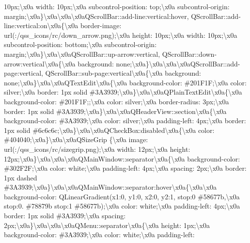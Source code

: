 \begin{DoxyCompactItemize}
10px;\textbackslash{}x0a width\+: 10px;\textbackslash{}x0a subcontrol-\/position\+: top;\textbackslash{}x0a subcontrol-\/origin\+: margin;\textbackslash{}x0a\}\textbackslash{}x0a\textbackslash{}x0a\textbackslash{}x0a\+Q\+Scroll\+Bar\+::add-\/line\+:vertical\+:hover, Q\+Scroll\+Bar\+::add-\/line\+:vertical\+:on\textbackslash{}x0a\{\textbackslash{}x0a border-\/image\+: url(\+:/qss\+\_\+icons/rc/down\+\_\+arrow.\+png);\textbackslash{}x0a height\+: 10px;\textbackslash{}x0a width\+: 10px;\textbackslash{}x0a subcontrol-\/position\+: bottom;\textbackslash{}x0a subcontrol-\/origin\+: margin;\textbackslash{}x0a\}\textbackslash{}x0a\textbackslash{}x0a\+Q\+Scroll\+Bar\+::up-\/arrow\+:vertical, Q\+Scroll\+Bar\+::down-\/arrow\+:vertical\textbackslash{}x0a\{\textbackslash{}x0a background\+: none;\textbackslash{}x0a\}\textbackslash{}x0a\textbackslash{}x0a\textbackslash{}x0a\+Q\+Scroll\+Bar\+::add-\/page\+:vertical, Q\+Scroll\+Bar\+::sub-\/page\+:vertical\textbackslash{}x0a\{\textbackslash{}x0a background\+: none;\textbackslash{}x0a\}\textbackslash{}x0a\textbackslash{}x0a\+Q\+Text\+Edit\textbackslash{}x0a\{\textbackslash{}x0a background-\/color\+: \#201\+F1\+F;\textbackslash{}x0a color\+: silver;\textbackslash{}x0a border\+: 1px solid \#3\+A3939;\textbackslash{}x0a\}\textbackslash{}x0a\textbackslash{}x0a\+Q\+Plain\+Text\+Edit\textbackslash{}x0a\{\textbackslash{}x0a background-\/color\+: \#201\+F1\+F;;\textbackslash{}x0a color\+: silver;\textbackslash{}x0a border-\/radius\+: 3px;\textbackslash{}x0a border\+: 1px solid \#3\+A3939;\textbackslash{}x0a\}\textbackslash{}x0a\textbackslash{}x0a\+Q\+Header\+View\+::section\textbackslash{}x0a\{\textbackslash{}x0a background-\/color\+: \#3\+A3939;\textbackslash{}x0a color\+: silver;\textbackslash{}x0a padding-\/left\+: 4px;\textbackslash{}x0a border\+: 1px solid \#6c6c6c;\textbackslash{}x0a\}\textbackslash{}x0a\textbackslash{}x0a\+Q\+Check\+Box\+:disabled\textbackslash{}x0a\{\textbackslash{}x0a color\+: \#404040;\textbackslash{}x0a\}\textbackslash{}x0a\textbackslash{}x0a\+Q\+Size\+Grip \{\textbackslash{}x0a image\+: url(\+:/qss\+\_\+icons/rc/sizegrip.\+png);\textbackslash{}x0a width\+: 12px;\textbackslash{}x0a height\+: 12px;\textbackslash{}x0a\}\textbackslash{}x0a\textbackslash{}x0a\textbackslash{}x0a\+Q\+Main\+Window\+::separator\textbackslash{}x0a\{\textbackslash{}x0a background-\/color\+: \#302\+F2\+F;\textbackslash{}x0a color\+: white;\textbackslash{}x0a padding-\/left\+: 4px;\textbackslash{}x0a spacing\+: 2px;\textbackslash{}x0a border\+: 1px dashed \#3\+A3939;\textbackslash{}x0a\}\textbackslash{}x0a\textbackslash{}x0a\+Q\+Main\+Window\+::separator\+:hover\textbackslash{}x0a\{\textbackslash{}x0a\textbackslash{}x0a background-\/color\+: Q\+Linear\+Gradient(x1\+:0, y1\+:0, x2\+:0, y2\+:1, stop\+:0 \#58677b,\textbackslash{}x0a stop\+:0. \#78879b stop\+:1 \#58677b);\textbackslash{}x0a color\+: white;\textbackslash{}x0a padding-\/left\+: 4px;\textbackslash{}x0a border\+: 1px solid \#3\+A3939;\textbackslash{}x0a spacing\+: 2px;\textbackslash{}x0a\}\textbackslash{}x0a\textbackslash{}x0a\textbackslash{}x0a\+Q\+Menu\+::separator\textbackslash{}x0a\{\textbackslash{}x0a height\+: 1px;\textbackslash{}x0a background-\/color\+: \#3\+A3939;\textbackslash{}x0a color\+: white;\textbackslash{}x0a padding-\/left\+: 
\end{DoxyCompactItemize}
